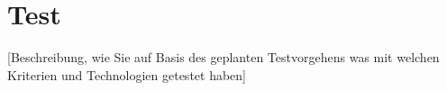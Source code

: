 \chapter{Test}
[Beschreibung, wie Sie auf Basis des geplanten Testvorgehens was mit welchen Kriterien und Technologien getestet haben]

